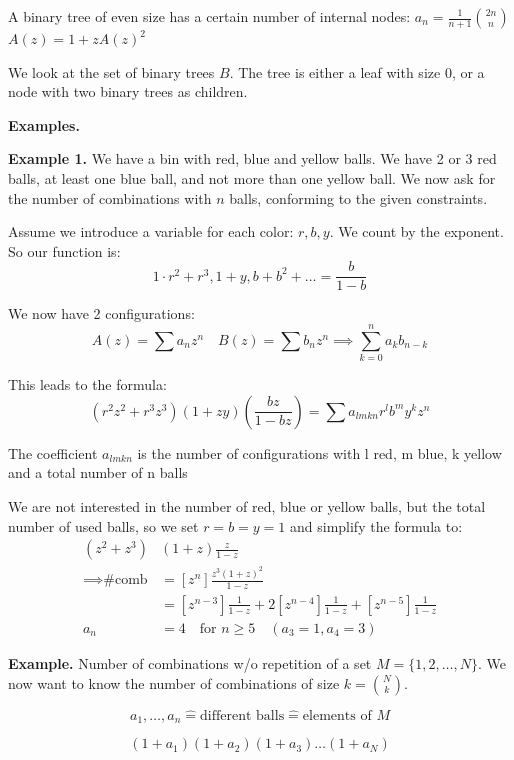 A binary tree of even size has a certain number of internal nodes: $\displaystyle{a_n = \frac{1}{n+1} {2n \choose n}}$\\
$A(z) = 1 + zA(z)^2$

We look at the set of binary trees $B$. The tree is either a leaf with size 0, or a node with two binary trees as children.

\textbf{Examples.}

\textbf{Example 1.}
We have a bin with red, blue and yellow balls. We have 2 or 3 red balls, at least one blue ball, and not more than one yellow ball. We now ask for the number of combinations with $n$ balls, conforming to the given constraints.

Assume we introduce a variable for each color: $r,b,y$. We count by the exponent. So our function is:
\[
    1\cdot r^2 + r^3,  1+y, b + b^2 + \ldots = \frac{b}{1-b}
\]

We now have 2 configurations:
\[
    A(z) = \sum a_n z^n \quad
    B(z) = \sum b_n z^n
    \implies \sum_{k=0}^{n} a_k b_{n-k}
\]

This leads to the formula:
\[
    (r^2  z^2+ r^3 z^3) (1+zy) \left(\frac{bz}{1-bz}\right)
    = \sum a_{lmkn} r^l b^m y^k z^n
\]

The coefficient $a_{lmkn}$ is the number of configurations with l red, m blue, k yellow and a total number of n balls

We are not interested in the number of red, blue or yellow balls, but the total number of used balls, so we set $r=b=y=1$ and simplify the formula to:
\begin{align*}
    (z^2 + z^3)&(1+z) \frac{z}{1-z} \\
    \implies \text{\# comb}
    &= \left[z^n\right] \frac{z^3(1+z)^2}{1-z} \\
    &= \left[z^{n-3}\right] \frac{1}{1-z}+ 2\left[z^{n-4}\right] \frac{1}{1-z} + \left[z^{n-5}\right] \frac{1}{1-z} \\
    a_n &= 4 \quad \text{for } n ≥ 5 \quad (a_3=1, a_4=3)
\end{align*}

\textbf{Example.}
Number of combinations w/o repetition of a set $M = \{1,2, \ldots ,N\}$. We now want to know the number of combinations of size $k = {N \choose k}$.

\[
    a_1, \ldots , a_n \mathrel{\hat{=}} \text{different balls} \mathrel{\hat{=}} \text{elements of } M
\]

\[
    (1+a_1)(1+a_2)(1+a_3) \ldots (1+a_N)
\]

